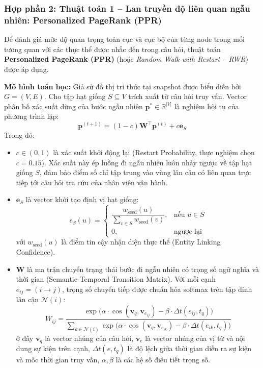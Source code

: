 \documentclass[a4paper,11pt]{article}
\begin{document}
\subsubsection{Hợp phần 2: Thuật toán 1 -- Lan truyền độ liên quan ngẫu nhiên: Personalized PageRank (PPR)}
\label{sec:algo-ppr}

Để đánh giá mức độ quan trọng toàn cục và cục bộ của từng node trong mối tương quan với các thực thể được nhắc đến trong câu hỏi, thuật toán \textbf{Personalized PageRank (PPR)} (hoặc \textit{Random Walk with Restart -- RWR}) được áp dụng.

\textbf{Mô hình toán học:} Giả sử đồ thị tri thức tại snapshot được biểu diễn bởi $G = (V, E)$. Cho tập hạt giống $S \subseteq V$ trích xuất từ câu hỏi truy vấn. Vector phân bố xác suất dừng của bước ngẫu nhiên $\mathbf{p}^* \in \mathbb{R}^{|V|}$ là nghiệm hội tụ của phương trình lặp:
\begin{equation}
    \mathbf{p}^{(t+1)} = (1 - c) \mathbf{W}^\top \mathbf{p}^{(t)} + c \mathbf{e}_{S}
    \label{eq:ppr}
\end{equation}
Trong đó:
\begin{itemize}[noitemsep]
    \item $c \in (0, 1)$ là xác suất khởi động lại (Restart Probability, thực nghiệm chọn $c = 0.15$). Xác suất này ép luồng đi ngẫu nhiên luôn nhảy ngược về tập hạt giống $S$, đảm bảo điểm số chỉ tập trung vào vùng lân cận có liên quan trực tiếp tới câu hỏi tra cứu của nhân viên vận hành.
    \item $\mathbf{e}_S$ là vector khởi tạo định vị hạt giống:
    \begin{equation}
        e_S(u) = \begin{cases} \dfrac{w_{\text{seed}}(u)}{\sum_{v \in S} w_{\text{seed}}(v)}, & \text{nếu } u \in S \\ 0, & \text{ngược lại} \end{cases}
    \end{equation}
    với $w_{\text{seed}}(u)$ là điểm tin cậy nhận diện thực thể (Entity Linking Confidence).
    \item $\mathbf{W}$ là ma trận chuyển trạng thái bước đi ngẫu nhiên có trọng số ngữ nghĩa và thời gian (Semantic-Temporal Transition Matrix). Với mỗi cạnh $e_{ij} = (i \rightarrow j)$, trọng số chuyển tiếp được chuẩn hóa softmax trên tập đỉnh lân cận $\mathcal{N}(i)$:
    \begin{equation}
        W_{ij} = \frac{\exp\Big(\alpha \cdot \cos(\mathbf{v}_q, \mathbf{v}_{e_{ij}}) - \beta \cdot \Delta t(e_{ij}, t_q)\Big)}{\sum_{k \in \mathcal{N}(i)} \exp\Big(\alpha \cdot \cos(\mathbf{v}_q, \mathbf{v}_{e_{ik}}) - \beta \cdot \Delta t(e_{ik}, t_q)\Big)}
    \end{equation}
    ở đây $\mathbf{v}_q$ là vector nhúng của câu hỏi, $\mathbf{v}_{e}$ là vector nhúng của vị từ và nội dung sự kiện trên cạnh, $\Delta t(e, t_q)$ là độ lệch giữa thời gian diễn ra sự kiện và mốc thời gian truy vấn, $\alpha, \beta$ là các hệ số điều tiết trọng số.
\end{itemize}
\end{document}
